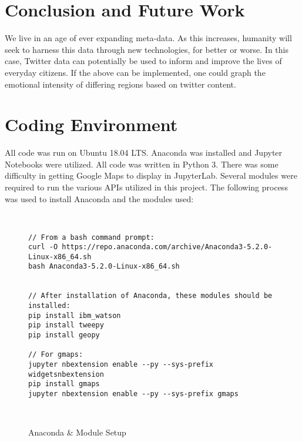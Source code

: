 \documentclass[12pt, oneside]{article}
\begin{document}
\section{Conclusion and Future Work}
We live in an age of ever expanding meta-data. As this increases, humanity will
seek to harness this data through new technologies, for better or worse. In
this case, Twitter data can potentially be used to inform and improve the lives
of everyday citizens. If the above can be implemented, one could graph
the emotional intensity of differing regions based on twitter content.

\newpage{}


%


\newpage{}
\appendix{}
\section{Coding Environment}
All code was run on Ubuntu 18.04 LTS. Anaconda was installed and Jupyter
Notebooks were utilized. All code was written in Python 3. There was some
difficulty in getting Google Maps to display in JupyterLab. Several modules
were required to run the various APIs utilized in this project. The following process was used to install Anaconda and the modules used:

\begin{figure}[H]
\begin{lstlisting}


// From a bash command prompt:
curl -O https://repo.anaconda.com/archive/Anaconda3-5.2.0-Linux-x86_64.sh
bash Anaconda3-5.2.0-Linux-x86_64.sh


// After installation of Anaconda, these modules should be installed:
pip install ibm_watson
pip install tweepy
pip install geopy

// For gmaps:
jupyter nbextension enable --py --sys-prefix widgetsnbextension
pip install gmaps
jupyter nbextension enable --py --sys-prefix gmaps

\end{lstlisting}
\caption{Anaconda \& Module Setup}\
\label{fig:code}
\end{figure}
\end{document}
